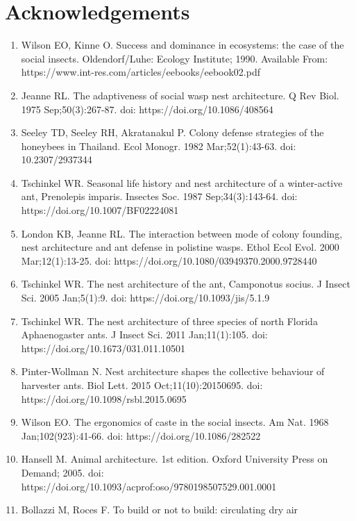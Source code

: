 \documentclass[3p]{elsarticle} %
\begin{document}
\hypertarget{acknowledgements}{%
\section{Acknowledgements}\label{acknowledgements}}

\begin{enumerate}
\def\labelenumi{\arabic{enumi}.}
\item
  Wilson EO, Kinne O. Success and dominance in ecosystems: the case of
  the social insects. Oldendorf/Luhe: Ecology Institute; 1990. Available
  From: https://www.int-res.com/articles/eebooks/eebook02.pdf
\item
  Jeanne RL. The adaptiveness of social wasp nest architecture. Q Rev
  Biol. 1975 Sep;50(3):267-87. doi: https://doi.org/10.1086/408564
\item
  Seeley TD, Seeley RH, Akratanakul P. Colony defense strategies of the
  honeybees in Thailand. Ecol Monogr. 1982 Mar;52(1):43-63. doi:
  10.2307/2937344
\item
  Tschinkel WR. Seasonal life history and nest architecture of a
  winter-active ant, Prenolepis imparis. Insectes Soc. 1987
  Sep;34(3):143-64. doi: https://doi.org/10.1007/BF02224081
\item
  London KB, Jeanne RL. The interaction between mode of colony founding,
  nest architecture and ant defense in polistine wasps. Ethol Ecol Evol.
  2000 Mar;12(1):13-25. doi:
  https://doi.org/10.1080/03949370.2000.9728440
\item
  Tschinkel WR. The nest architecture of the ant, Camponotus socius. J
  Insect Sci. 2005 Jan;5(1):9. doi: https://doi.org/10.1093/jis/5.1.9
\item
  Tschinkel WR. The nest architecture of three species of north Florida
  Aphaenogaster ants. J Insect Sci. 2011 Jan;11(1):105. doi:
  https://doi.org/10.1673/031.011.10501
\item
  Pinter-Wollman N. Nest architecture shapes the collective behaviour of
  harvester ants. Biol Lett. 2015 Oct;11(10):20150695. doi:
  https://doi.org/10.1098/rsbl.2015.0695
\item
  Wilson EO. The ergonomics of caste in the social insects. Am Nat. 1968
  Jan;102(923):41-66. doi: https://doi.org/10.1086/282522
\item
  Hansell M. Animal architecture. 1st edition. Oxford University Press
  on Demand; 2005. doi:
  https://doi.org/10.1093/acprof:oso/9780198507529.001.0001
\item
  Bollazzi M, Roces F. To build or not to build: circulating dry air

\end{enumerate}
\end{document}

